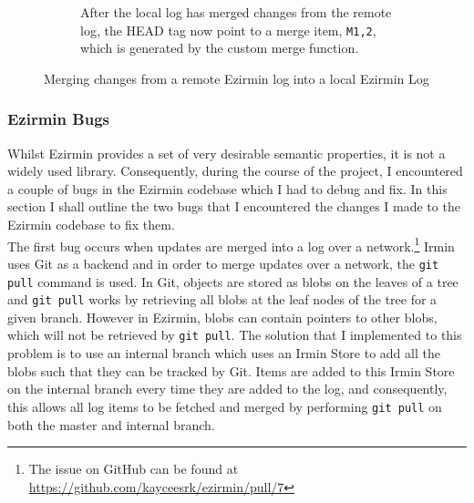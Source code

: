 \documentclass[12pt,a4paper,twoside,openright]{report}
\begin{document}
\begin{figure}
\begin{subfigure}[b]{0.5\textwidth}
			\caption{After the local log has merged changes from the remote log, the HEAD tag now point to a merge item, \texttt{M1,2}, which is generated by the custom merge function.}
		\end{subfigure}
		\caption{Merging changes from a remote Ezirmin log into a local Ezirmin Log}	
		\label{fig:ezirminmerges}
	\end{figure}

	\subsubsection*{Ezirmin Bugs}
	Whilst Ezirmin provides a set of very desirable semantic properties, it is not a widely used library. 
	Consequently, during the course of the project, I encountered a couple of bugs in the Ezirmin codebase which I had to debug and fix.
	In this section I shall outline the two bugs that I encountered the changes I made to the Ezirmin codebase to fix them.\\
	
	The first bug occurs when updates are merged into a log over a network.\footnote{The issue on GitHub can be found at \href{https://github.com/kayceesrk/ezirmin/pull/7}{https://github.com/kayceesrk/ezirmin/pull/7}}
	Irmin uses Git as a backend and in order to merge updates over a network, the \texttt{git pull} command is used.
	In Git, objects are stored as blobs on the leaves of a tree and \texttt{git pull} works by retrieving all blobs at the leaf nodes of the tree for a given branch.
	However in Ezirmin, blobs can contain pointers to other blobs, which will not be retrieved by \texttt{git pull}.
	The solution that I implemented to this problem is to use an internal branch which uses an Irmin Store to add all the blobs such that they can be tracked by Git.
	Items are added to this Irmin Store on the internal branch every time they are added to the log, and consequently, this allows all log items to be fetched and merged by performing \texttt{git pull} on both the master and internal branch.\\
\end{document}
